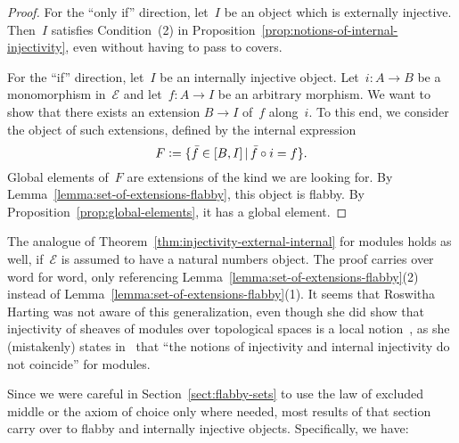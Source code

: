\documentclass[oneside]{amsart}
\theoremstyle{definition}
\theoremstyle{plain}
\theoremstyle{remark}
\newcommand{\E}{\mathcal{E}}
\newcommand{\defeq}{\vcentcolon=}
\renewcommand{\_}{\mathpunct{.}\,}
\begin{document}
\begin{proof}For the ``only if'' direction, let~$I$ be an object
which is externally injective. Then~$I$ satisfies Condition~(2) in
Proposition~\ref{prop:notions-of-internal-injectivity}, even without having to
pass to covers.

For the ``if'' direction, let~$I$ be an internally
injective object. Let~$i : A \to B$ be a monomorphism in~$\E$ and let~$f :
A \to I$ be an arbitrary morphism. We want to show that there exists an
extension $B \to I$ of~$f$ along~$i$. To this end, we consider the object of
such extensions, defined by the internal expression
\[ F \defeq \{ \bar{f} \in [B,I] \,|\, \bar{f} \circ i = f \}. \]
Global elements of~$F$ are extensions of the kind we are looking for.
By Lemma~\ref{lemma:set-of-extensions-flabby}, this object is flabby.
By Proposition~\ref{prop:global-elements}, it has a global element.
\end{proof}

The analogue of Theorem~\ref{thm:injectivity-external-internal} for modules
holds as well, if~$\E$ is assumed to have a natural numbers object. The proof
carries over word for word, only referencing
Lemma~\ref{lemma:set-of-extensions-flabby}(2) instead of
Lemma~\ref{lemma:set-of-extensions-flabby}(1).
It seems that Roswitha Harting was not aware of this generalization, even though she did show that
injectivity of sheaves of modules over topological spaces is a local
notion~\cite[Remark~5]{harting:remark}, as she
(mistakenly) states in~\cite[page~233]{harting:remark} that ``the notions of
injectivity and internal injectivity do not coincide'' for modules.

Since we were careful in Section~\ref{sect:flabby-sets} to use the law of
excluded middle or the axiom of choice only where needed, most results of that
section carry over to flabby and internally injective objects. Specifically, we
have:
\end{document}
